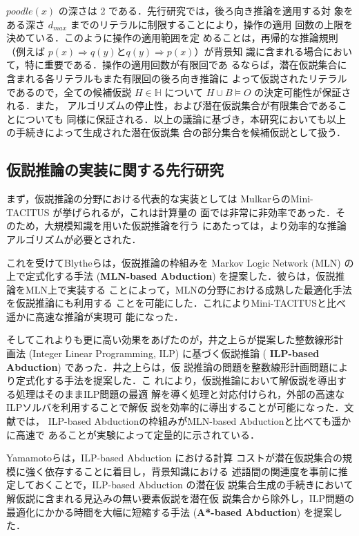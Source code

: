 \documentclass[japanese]{jnlp_1.4}
\begin{document}
$\mathit{poodle}(x)$ の深さは 2 である．先行研究では，後ろ向き推論を適用する対
象をある深さ $d_\mathit{max}$ までのリテラルに制限することにより，操作の適用
回数の上限を決めている．このように操作の適用範囲を定
めることは，再帰的な推論規則（例えば $p(x)
\Rightarrow q(y)$と$q(y) \Rightarrow p(x)$）が背景知
識に含まれる場合において，特に重要である．操作の適用回数が有限回であ
るならば，潜在仮説集合に含まれる各リテラルもまた有限回の後ろ向き推論に
よって仮説されたリテラルであるので，全ての候補仮説 $H \in \mathbb{H}$
について $H \cup B \models O$ の決定可能性が保証される．また，
アルゴリズムの停止性，および潜在仮説集合が有限集合であることについても
同様に保証される．以上の議論に基づき，本研究においても以上の手続きによって生成された潜在仮説集
合の部分集合を候補仮説として扱う．



\subsection{仮説推論の実装に関する先行研究}

まず，仮説推論の分野における代表的な実装としては
MulkarらのMini-TACITUS \cite{Mulkar07} が挙げられるが，これは計算量の
面では非常に非効率であった．そのため，大規模知識を用いた仮説推論を行う
にあたっては，より効率的な推論アルゴリズムが必要とされた．

これを受けてBlytheらは，仮説推論の枠組みを Markov Logic
Network (MLN) \cite{Richardson06} の上で定式化する手法 ({\bf MLN-based
Abduction}) を提案した\cite{Blythe11}．彼らは，仮説推論をMLN上で実装する
ことによって，MLNの分野における成熟した最適化手法を仮説推論にも利用する
ことを可能にした．これによりMini-TACITUSと比べ遥かに高速な推論が実現可
能になった．

そしてこれよりも更に高い効果をあげたのが，井之上らが提案した整数線形計
画法 (Integer Linear Programming, ILP) に基づく仮説推論 ({\bf
ILP-based Abduction}) であった\cite{Inoue11,Inoue12b}．井之上らは，仮
説推論の問題を整数線形計画問題により定式化する手法を提案した．こ
れにより，仮説推論において解仮説を導出する処理はそのままILP問題の最適
解を導く処理と対応付けられ，外部の高速なILPソルバを利用することで解仮
説を効率的に導出することが可能になった．文献\cite{Inoue12b}では，
ILP-based Abductionの枠組みがMLN-based Abductionと比べても遥かに高速で
あることが実験によって定量的に示されている．

Yamamotoらは，ILP-based Abduction \cite{Inoue11,Inoue12b}における計算
コストが潜在仮説集合の規模に強く依存することに着目し，背景知識における
述語間の関連度を事前に推定しておくことで，ILP-based Abduction の潜在仮
説集合生成の手続きにおいて解仮説に含まれる見込みの無い要素仮説を潜在仮
説集合から除外し，ILP問題の最適化にかかる時間を大幅に短縮する手法
({\bf A*-based Abduction}) を提案した\cite{Yamamoto15}．
\end{document}
